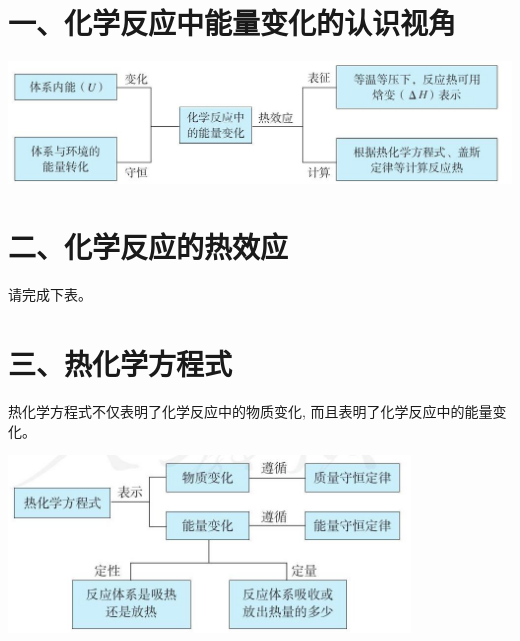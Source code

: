 \documentclass[10pt]{article}
\begin{document}
\section*{一、化学反应中能量变化的认识视角}

\begin{center}
\includegraphics[max width=1.0\textwidth]{images/0190da9d-8bfd-732f-bc2c-0b21d0f13b91_25_773340.jpg}
\end{center}

\section*{二、化学反应的热效应}

请完成下表。

\begin{center}
\end{center}

\section*{三、热化学方程式}

热化学方程式不仅表明了化学反应中的物质变化, 而且表明了化学反应中的能量变化。

\begin{center}
\includegraphics[max width=0.8\textwidth]{images/0190da9d-8bfd-732f-bc2c-0b21d0f13b91_25_712171.jpg}
\end{center}
\end{document}
